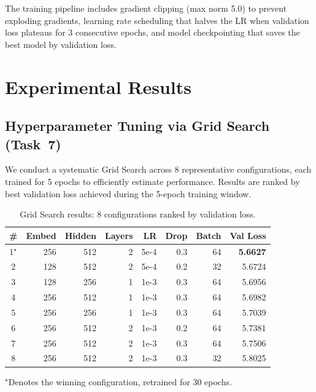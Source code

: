 \documentclass[runningheads]{llncs}
\begin{document}
The training pipeline includes gradient clipping (max norm 5.0) to prevent exploding gradients, learning rate scheduling that halves the LR when validation loss plateaus for 3 consecutive epochs, and model checkpointing that saves the best model by validation loss.

\section{Experimental Results}\label{sec:results}

\subsection{Hyperparameter Tuning via Grid Search (Task~7)}

We conduct a systematic Grid Search across 8 representative configurations, each trained for 5 epochs to efficiently estimate performance. Results are ranked by best validation loss achieved during the 5-epoch training window.

\begin{table}[H]
\centering
\caption{Grid Search results: 8 configurations ranked by validation loss.}
\label{tab:grid}
\begin{tabular}{@{}crrrrrr r@{}}
\toprule
\textbf{\#} & \textbf{Embed} & \textbf{Hidden} & \textbf{Layers} & \textbf{LR} & \textbf{Drop} & \textbf{Batch} & \textbf{Val Loss} \\
\midrule
1$^\star$ & 256 & 512 & 2 & 5e-4 & 0.3 & 64 & \textbf{5.6627} \\
2 & 128 & 512 & 2 & 5e-4 & 0.2 & 32 & 5.6724 \\
3 & 128 & 256 & 1 & 1e-3 & 0.3 & 64 & 5.6956 \\
4 & 256 & 512 & 1 & 1e-3 & 0.3 & 64 & 5.6982 \\
5 & 256 & 256 & 1 & 1e-3 & 0.3 & 64 & 5.7039 \\
6 & 256 & 512 & 2 & 1e-3 & 0.2 & 64 & 5.7381 \\
7 & 256 & 512 & 2 & 1e-3 & 0.3 & 64 & 5.7506 \\
8 & 256 & 512 & 2 & 1e-3 & 0.3 & 32 & 5.8025 \\
\bottomrule
\end{tabular}
\begin{flushleft}
\small $^\star$Denotes the winning configuration, retrained for 30 epochs.
\end{flushleft}
\end{table}
\end{document}
